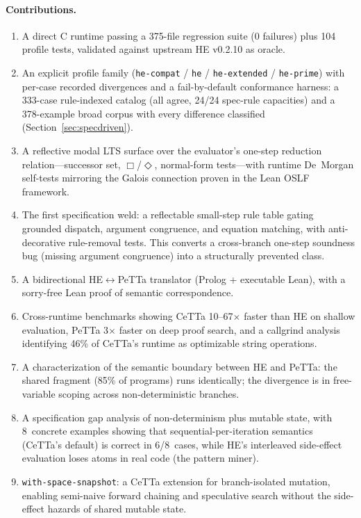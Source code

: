 \documentclass[11pt]{article}
\newcommand{\code}[1]{\texttt{#1}}
\newcommand{\PeTTa}{\textup{PeTTa}}
\newcommand{\HE}{\textup{HE}}
\newcommand{\CeTTa}{\textup{CeTTa}}
\begin{document}
\paragraph{Contributions.}
\begin{enumerate}
\item A direct C runtime passing a 375-file regression suite (0
  failures) plus 104 profile tests, validated against upstream \HE{}
  v0.2.10 as oracle.
\item An explicit profile family (\code{he-compat} / \code{he} /
  \code{he-extended} / \code{he-prime}) with per-case recorded
  divergences and a fail-by-default conformance harness: a 333-case
  rule-indexed catalog (all agree, 24/24 spec-rule capacities) and a
  378-example broad corpus with every difference classified
  (Section~\ref{sec:specdriven}).
\item A reflective modal LTS surface over the evaluator's one-step
  reduction relation---successor set, $\Box$/$\Diamond$,
  normal-form tests---with runtime De~Morgan self-tests mirroring the
  Galois connection proven in the Lean OSLF framework.
\item The first specification weld: a reflectable small-step rule
  table gating grounded dispatch, argument congruence, and equation
  matching, with anti-decorative rule-removal tests.  This converts a
  cross-branch one-step soundness bug (missing argument congruence)
  into a structurally prevented class.
\item A bidirectional \HE{}$\leftrightarrow$\PeTTa{} translator
  (Prolog + executable Lean), with a sorry-free Lean proof of semantic
  correspondence.
\item Cross-runtime benchmarks showing \CeTTa{} 10--67$\times$ faster
  than \HE{} on shallow evaluation, \PeTTa{} 3$\times$ faster on deep
  proof search, and a callgrind analysis identifying 46\% of \CeTTa{}'s
  runtime as optimizable string operations.
\item A characterization of the semantic boundary between \HE{} and
  \PeTTa{}: the shared fragment (85\% of programs) runs identically; the
  divergence is in free-variable scoping across non-deterministic branches.
\item A specification gap analysis of non-determinism plus mutable state,
  with 8~concrete examples showing that sequential-per-iteration semantics
  (CeTTa's default) is correct in 6/8~cases, while \HE{}'s interleaved
  side-effect evaluation loses atoms in real code (the pattern miner).
\item \code{with-space-snapshot}: a CeTTa extension for branch-isolated
  mutation, enabling semi-naive forward chaining and speculative search
  without the side-effect hazards of shared mutable state.
\end{enumerate}
\end{document}
